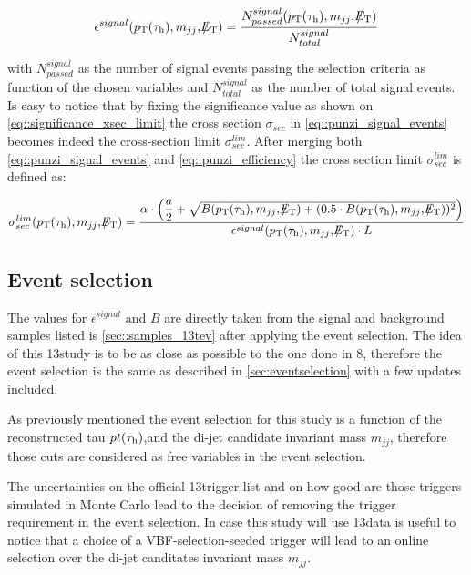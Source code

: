 \begin{equation}
\epsilon^{signal} ( p_{\text{T}}(\tau_{\text{h}}) , m_{jj} ,  \slash\mkern-12mu{E}_{\text{T}} ) = \dfrac{N^{signal}_{passed}(p_{\text{T}}(\tau_{\text{h}}) , m_{jj} ,  \slash\mkern-12mu{E}_{\text{T}})}{N^{signal}_{total}}
\label{eq::punzi_efficiency}
\end{equation}

with $N^{signal}_{passed}$ as the number of signal events passing the selection criteria as function of the chosen variables and $N^{signal}_{total}$ as the number of total signal events. Is easy to notice that by fixing the significance value as shown on \autoref{eq::significance_xsec_limit} the cross section $\sigma_{sec}$ in \autoref{eq::punzi_signal_events} becomes indeed the cross-section limit $\sigma^{lim}_{sec}$. After merging both \autoref{eq::punzi_signal_events} and \autoref{eq::punzi_efficiency} the cross section limit $\sigma^{lim}_{sec}$ is defined as:
	
\begin{equation}
\sigma^{lim}_{sec}( \pt(\hadtau) , m_{jj} ,  \met ) = \dfrac{\alpha \cdot\left(\dfrac{a}{2} + \sqrt{B( \pt(\hadtau) , m_{jj} ,  \met ) + (0.5 \cdot B( \pt(\hadtau) , m_{jj} ,  \met ))^{2}}\right)}{\epsilon^{signal} ( \pt(\hadtau) , m_{jj} ,  \met ) \cdot L}
\label{eq::xsec_lim}
\end{equation}



\subsection{Event selection}
\label{subsec::event_sel_13tev}

The values for $\epsilon^{signal}$ and $B$ are directly taken from the signal and background samples listed is \autoref{sec::samples_13tev} after applying the event selection. The idea of this 13\tev study is to be as close as possible to the one done in 8\tev, therefore the event selection is the same as described in \autoref{sec:eventselection} with a few updates included.

As previously mentioned the event selection for this study is a function of the reconstructed tau $pt(\tau_{\text{h}})$,\met and the di-jet candidate invariant mass $m_{jj}$, therefore those cuts are considered as free variables in the event selection. 

The uncertainties on the official 13\tev trigger list and on how good are those triggers simulated in Monte Carlo lead to the decision of removing the trigger requirement in the event selection. In case this study will use 13\tev data is useful to notice that a choice of a VBF-selection-seeded trigger will lead to an online selection over the di-jet canditates invariant mass $m_{jj}$.

